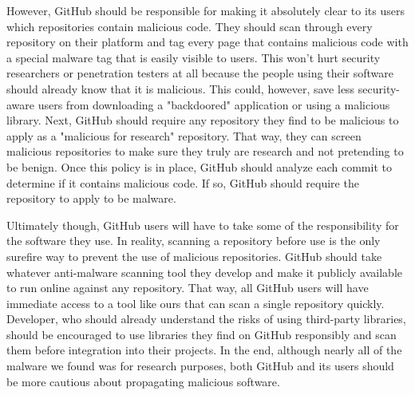 \documentclass[]{acmart}
\begin{document}
However, GitHub should be responsible for making it absolutely clear to its users which repositories contain malicious code. They should scan through every repository on their platform and tag every page that contains malicious code with a special malware tag that is easily visible to users. This won't hurt security researchers or penetration testers at all because the people using their software should already know that it is malicious. This could, however, save less security-aware users from downloading a "backdoored" application or using a malicious library. Next, GitHub should require any repository they find to be malicious to apply as a "malicious for research" repository. That way, they can screen malicious repositories to make sure they truly are research and not pretending to be benign. Once this policy is in place, GitHub should analyze each commit to determine if it contains malicious code. If so, GitHub should require the repository to apply to be malware.

Ultimately though, GitHub users will have to take some of the responsibility for the software they use. In reality, scanning a repository before use is the only surefire way to prevent the use of malicious repositories. GitHub should take whatever anti-malware scanning tool they develop and make it publicly available to run online against any repository. That way, all GitHub users will have immediate access to a tool like ours that can scan a single repository quickly. Developer, who should already understand the risks of using third-party libraries, should be encouraged to use libraries they find on GitHub responsibly and scan them before integration into their projects. In the end, although nearly all of the malware we found was for research purposes, both GitHub and its users should be more cautious about propagating malicious software.
\end{document}

